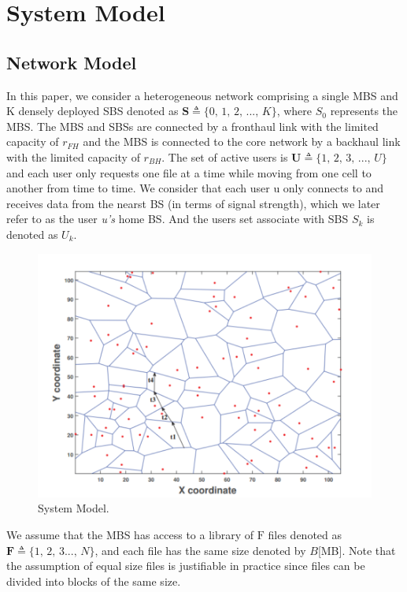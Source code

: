 \documentclass[conference]{IEEEtran}
\begin{document}
\section{System Model}
\subsection{Network Model}
In this paper, we consider a heterogeneous network comprising a single MBS and K densely deployed SBS denoted as $\mathbf{S} \triangleq\{0\mathrm{,\,}1\mathrm{,\,}2\mathrm{,\,}...\mathrm{,\,}K\}$, where $S_0$ represents the MBS. The MBS and SBSs are connected by a fronthaul link with the limited capacity of $ r_{FH}$ and the MBS is connected to the core network by a backhaul link with the limited capacity of $ r_{BH}$. The set of active users is $\mathbf{U} \triangleq\{1\mathrm{,\,}2\mathrm{,\,}3\mathrm{,\,}...\mathrm{,\,}U\}$ and each user only requests one file at a time while moving from one cell to another from time to time. We consider that each user u only connects to and receives data from the nearst BS (in terms of signal strength), which we later refer to as the user \emph{u’s} home BS. And the users set associate with SBS $S_k$ is denoted as $U_k$.

\begin{figure}[htbp]
 \centerline{\includegraphics[scale=0.7]{fig1.png}}
 \caption{System Model.}
 \label{fig 1}
\end{figure}

We assume that the MBS has access to a library of $\mathrm{F}$ files denoted as $\mathbf{F} \triangleq\{1\mathrm{,\,}2\mathrm{,\,}3...\mathrm{,\,}N\}$, and each file has the same size denoted by $B$[MB]. Note that the assumption of equal size files is justifiable in practice since files can be divided into blocks of the same size.
\end{document}
